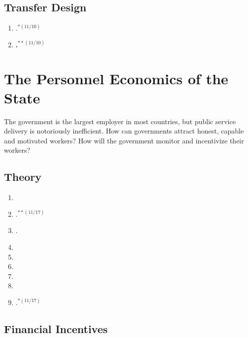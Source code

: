 \documentclass[11pt]{article}
\begin{document}
\subsection{Transfer Design}

\begin{enumerate}
\item {}.$^{*(11/10)}$
\item \textbf{.$^{**(11/10)}$}
\end{enumerate}

\section{The Personnel Economics of the State}
The government is the largest employer in most countries, but public service delivery is notoriously inefficient. How can governments attract honest, capable and motivated workers? How will the government monitor and incentivize their workers?


\subsection{Theory}

\begin{enumerate}
\item {}
\item \textbf{}.$^{**(11/17)}$
\item {}.
\item {}
\item {}
\item {}
\item {}
\item {}
\item {}.$^{*(11/17)}$
\end{enumerate}

\subsection{Financial Incentives}
\end{document}
